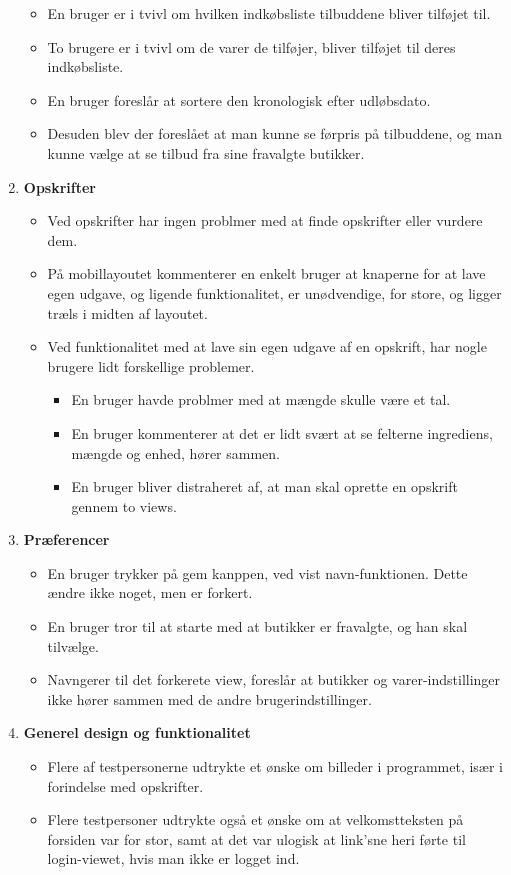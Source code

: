 \begin{enumerate}
\begin{itemize}
      \item En bruger er i tvivl om hvilken indkøbsliste tilbuddene bliver tilføjet til.
      \item To brugere er i tvivl om de varer de tilføjer, bliver tilføjet til deres indkøbsliste.
      \item En bruger foreslår at sortere den kronologisk efter udløbsdato.
      \item Desuden blev der foreslået at man kunne se førpris på tilbuddene, og man kunne vælge at se tilbud fra sine fravalgte butikker.
   \end{itemize}
   \item \textbf{Opskrifter}
   \begin{itemize}
      \item Ved opskrifter har ingen problmer med at finde opskrifter eller vurdere dem.
      \item På mobillayoutet kommenterer en enkelt bruger at knaperne for at lave egen udgave, og ligende funktionalitet, er unødvendige, for store, og ligger træls i midten af layoutet.
      \item Ved funktionalitet med at lave sin egen udgave af en opskrift, har nogle brugere lidt forskellige problemer.
      \begin{itemize}
         \item En bruger havde problmer med at mængde skulle være et tal.
         \item En bruger kommenterer at det er lidt svært at se felterne ingrediens, mængde og enhed, hører sammen.
         \item En bruger bliver distraheret af, at man skal oprette en opskrift gennem to views.
      \end{itemize} 
   \end{itemize}
   \item \textbf{Præferencer}
   \begin{itemize}
      \item En bruger  trykker på gem kanppen, ved vist navn-funktionen. 
      Dette ændre ikke noget, men er forkert.
      \item En bruger tror til at starte med at butikker er fravalgte, og han skal tilvælge.
      \item Navngerer til det forkerete view, foreslår at butikker og varer-indstillinger ikke hører sammen med de andre brugerindstillinger.
   \end{itemize}
   \item \textbf{Generel design og funktionalitet}
   \begin{itemize}
      \item Flere af testpersonerne udtrykte et ønske om billeder i programmet, især i forindelse med opskrifter.
      \item Flere testpersoner udtrykte også et ønske om at velkomstteksten på forsiden var for stor, samt at det var ulogisk at link'sne heri førte til login-viewet, hvis man ikke er logget ind.
   \end{itemize}
\end{enumerate}

